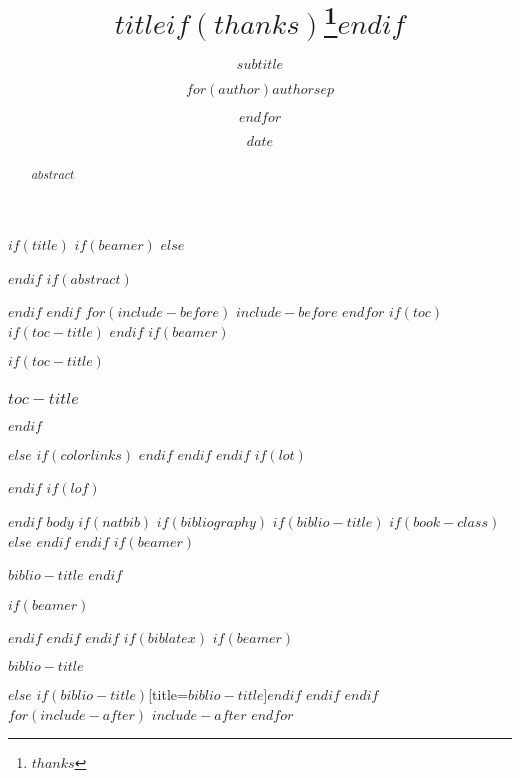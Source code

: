 \documentclass[
$if(fontsize)$
  $fontsize$,
$endif$
$if(lang)$
  $babel-lang$,
$endif$
$if(papersize)$
  $papersize$paper,
$endif$
$if(beamer)$
  ignorenonframetext,
  $if(handout)$
    handout,
  $endif$
  $if(aspectratio)$
    aspectratio=$aspectratio$,
  $endif$
$endif$
$for(classoption)$
  $classoption$$sep$,
$endfor$
]{$documentclass$}
\title{$title$$if(thanks)$\thanks{$thanks$}$endif$}
\subtitle{$subtitle$}
\author{$for(author)$$author$$sep$ \and $endfor$}
\date{$date$}
\institute{$for(institute)$$institute$$sep$ \and $endfor$}
\newif\ifbibliography
\begin{document}
$if(title)$
  $if(beamer)$
    \frame{\titlepage}
  $else$
    \maketitle
  $endif$
  $if(abstract)$
    \begin{abstract}
      $abstract$
    \end{abstract}
  $endif$
$endif$
$for(include-before)$
  $include-before$
$endfor$
$if(toc)$
  $if(toc-title)$
    \renewcommand*\contentsname{$toc-title$}
  $endif$
  $if(beamer)$
    \begin{frame}
      $if(toc-title)$
        \frametitle{$toc-title$}
      $endif$
      \tableofcontents[hideallsubsections]
    \end{frame}
  $else$
    {
    $if(colorlinks)$
      \hypersetup{linkcolor=$if(toccolor)$$toccolor$$else$$endif$}
    $endif$
    \setcounter{tocdepth}{$toc-depth$}
    \tableofcontents
    }
  $endif$
$endif$
$if(lot)$
  \listoftables
$endif$
$if(lof)$
  \listoffigures
$endif$
$body$
$if(natbib)$
  $if(bibliography)$
    $if(biblio-title)$
      $if(book-class)$
        \renewcommand\bibname{$biblio-title$}
      $else$
        \renewcommand\refname{$biblio-title$}
      $endif$
    $endif$
    $if(beamer)$
      \begin{frame}[allowframebreaks]{$biblio-title$}
        \bibliographytrue
    $endif$
    
    $if(beamer)$
      \end{frame}
    $endif$
  $endif$
$endif$
$if(biblatex)$
  $if(beamer)$
    \begin{frame}[allowframebreaks]{$biblio-title$}
      \bibliographytrue
      \printbibliography[heading=none]
    \end{frame}
  $else$
    \printbibliography$if(biblio-title)$[title=$biblio-title$]$endif$
  $endif$
$endif$
$for(include-after)$
  $include-after$
$endfor$
\end{document}
